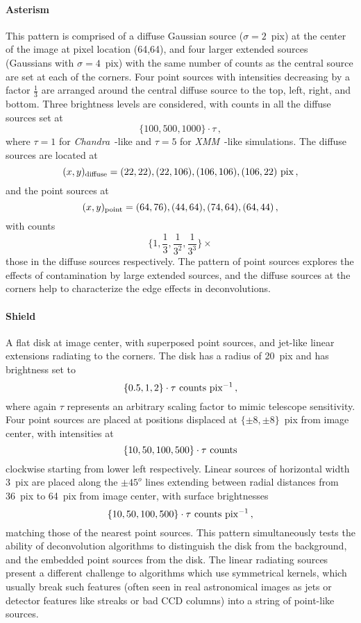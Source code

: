 \documentclass[twocolumn]{aastex631}
\newcommand{\chandra}{\textit{Chandra}~}
\newcommand{\xmm}{\textit{XMM}~}
\begin{document}
    \paragraph{Asterism} This pattern is comprised of a diffuse Gaussian source ($\sigma=2$~pix) at the center of the image at pixel location (64,64), and four larger extended sources (Gaussians with $\sigma=4$~pix) with the same number of counts as the central source are set at each of the corners.  Four point sources with intensities decreasing by a factor $\frac{1}{3}$ are arranged around the central diffuse source to the top, left, right, and bottom.  Three brightness levels are considered, with counts in all the diffuse sources set at 
    $$\{100, 500, 1000\} \cdot \tau \,,$$
    where $\tau=1$ for \chandra-like and $\tau=5$ for \xmm-like simulations.  The diffuse sources are located at
    $$(x,y)_{{\rm diffuse}} = (22,22), (22,106), (106,106), (106,22) ~{\rm pix} \,,$$
    and the point sources at
    $$(x,y)_{{\rm point}} = (64,76), (44,64), (74,64), (64,44) \,,$$
    with counts
    $$\{1, \frac{1}{3}, \frac{1}{3^2}, \frac{1}{3^3} \} \times$$
    those in the diffuse sources respectively.  The pattern of point sources explores the effects of contamination by large extended sources, and the diffuse sources at the corners help to characterize the edge effects in deconvolutions.
    
    \paragraph{Shield} A flat disk at image center, with superposed point sources, and jet-like linear extensions radiating to the corners.  The disk has a radius of 20~pix and has brightness set to
    $$\{0.5, 1, 2\} \cdot \tau ~{\rm counts~pix^{-1}} \,,$$
    where again $\tau$ represents an arbitrary scaling factor to mimic telescope sensitivity.  Four point sources are placed at positions displaced at $\{\pm8,\pm8\}$~pix from image center, with intensities at
    $$\{10, 50, 100, 500\} \cdot \tau ~{\rm counts}$$
    clockwise starting from lower left respectively.  Linear sources of horizontal width 3~pix are placed along the $\pm45^o$ lines extending between radial distances from 36~pix to 64~pix from image center, with surface brightnesses
    $$\{10, 50, 100, 500\} \cdot \tau ~{\rm counts~pix^{-1}} \,,$$
    matching those of the nearest point sources.  This pattern simultaneously tests the ability of deconvolution algorithms to distinguish the disk from the background, and the embedded point sources from the disk.  The linear radiating sources present a different challenge to algorithms which use symmetrical kernels, which usually break such features (often seen in real astronomical images as jets or detector features like streaks or bad CCD columns) into a string of point-like sources.
\end{document}
